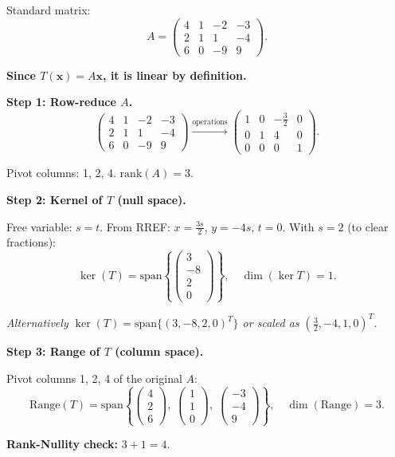 \documentclass[12pt,a3paper]{article}
\begin{document}
\begin{tcolorbox}[enhanced,breakable,
  colback=cF!4,colframe=cF,boxrule=0.8pt,arc=5pt,
  title={\textbf{Answer --- $T:\mathbb{R}^4\to\mathbb{R}^3$, $T(x,y,s,t)=(\ldots)$; Kernel \& Range}},
  fonttitle=\bfseries\color{white},colbacktitle=cF]

Standard matrix:
\[
A=\begin{pmatrix}4&1&-2&-3\\2&1&1&-4\\6&0&-9&9\end{pmatrix}.
\]

\textbf{Since $T(\mathbf{x})=A\mathbf{x}$, it is linear by definition.}

\textbf{Step 1: Row-reduce $A$.}
\[
\begin{pmatrix}4&1&-2&-3\\2&1&1&-4\\6&0&-9&9\end{pmatrix}
\xrightarrow{\text{operations}}
\begin{pmatrix}1&0&-\frac{3}{2}&0\\0&1&4&0\\0&0&0&1\end{pmatrix}.
\]

Pivot columns: 1, 2, 4. $\mathrm{rank}(A)=3$.

\medskip\textbf{Step 2: Kernel of $T$ (null space).}

Free variable: $s=t$. From RREF: $x=\tfrac{3s}{2}$, $y=-4s$, $t=0$. With $s=2$ (to clear fractions):
\[
\boxed{\ker(T)=\mathrm{span}\!\left\{\begin{pmatrix}3\\-8\\2\\0\end{pmatrix}\right\},\quad\dim(\ker T)=1.}
\]

\textit{Alternatively $\ker(T)=\mathrm{span}\{(3,-8,2,0)^T\}$ or scaled as $(\tfrac{3}{2},-4,1,0)^T$.}

\medskip\textbf{Step 3: Range of $T$ (column space).}

Pivot columns 1, 2, 4 of the original $A$:
\[
\boxed{\mathrm{Range}(T)=\mathrm{span}\!\left\{\begin{pmatrix}4\\2\\6\end{pmatrix},\;\begin{pmatrix}1\\1\\0\end{pmatrix},\;\begin{pmatrix}-3\\-4\\9\end{pmatrix}\right\},\quad\dim(\mathrm{Range})=3.}
\]

\textbf{Rank-Nullity check:} $3+1=4$. \checkmark

\end{tcolorbox}
\end{document}
